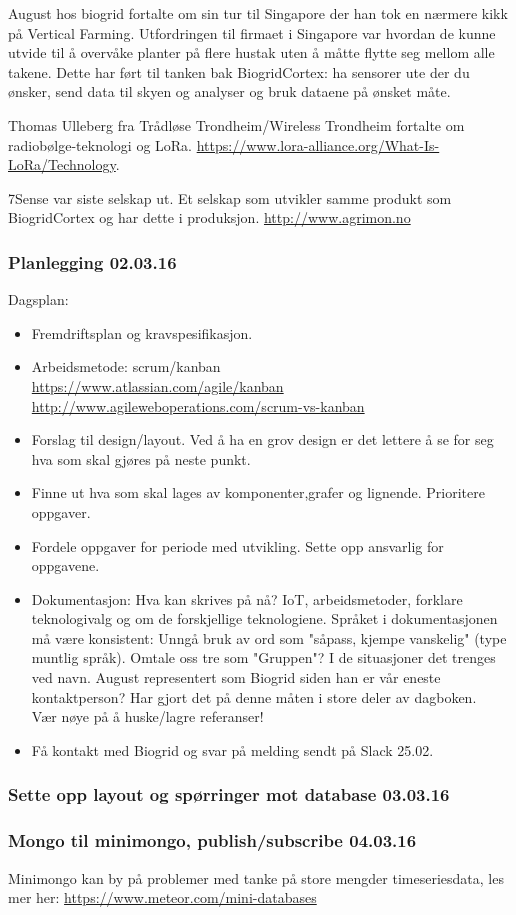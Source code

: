 \documentclass[12pt, oneside]{article}
\begin{document}
August hos biogrid fortalte om sin tur til Singapore der han tok en nærmere kikk på Vertical Farming. Utfordringen til firmaet i Singapore var hvordan de kunne utvide til å overvåke planter på flere hustak uten å måtte flytte seg mellom alle takene. Dette har ført til tanken bak BiogridCortex: ha sensorer ute der du ønsker, send data til skyen og analyser og bruk dataene på ønsket måte.

Thomas Ulleberg fra Trådløse Trondheim/Wireless Trondheim fortalte om radiobølge-teknologi og LoRa. \url{https://www.lora-alliance.org/What-Is-LoRa/Technology}. 

7Sense var siste selskap ut. Et selskap som utvikler samme produkt som BiogridCortex og har dette i produksjon. \url{http://www.agrimon.no}



\subsubsection{Planlegging 02.03.16} 
Dagsplan:
\begin{itemize}
\item Fremdriftsplan og kravspesifikasjon. 
\item Arbeidsmetode: scrum/kanban\\
\url{https://www.atlassian.com/agile/kanban}\\
\url{http://www.agileweboperations.com/scrum-vs-kanban}
\item Forslag til design/layout. Ved å ha en grov design er det lettere å se for seg hva som skal gjøres på neste punkt. 
\item Finne ut hva som skal lages av komponenter,grafer og lignende. Prioritere oppgaver.
\item Fordele oppgaver for periode med utvikling. Sette opp ansvarlig for oppgavene.
\item Dokumentasjon: Hva kan skrives på nå? IoT, arbeidsmetoder, forklare teknologivalg og om de forskjellige teknologiene. Språket i dokumentasjonen må være konsistent: Unngå bruk av ord som "såpass, kjempe vanskelig" (type muntlig språk). Omtale oss tre som "Gruppen"? I de situasjoner det trenges ved navn. August representert som Biogrid siden han er vår eneste kontaktperson? Har gjort det på denne måten i store deler av dagboken. \\ 
Vær nøye på å huske/lagre referanser!
\item Få kontakt med Biogrid og svar på melding sendt på Slack 25.02.
\end{itemize}



\subsubsection{Sette opp layout og spørringer mot database 03.03.16}



\subsubsection{Mongo til minimongo, publish/subscribe 04.03.16}
Minimongo kan by på problemer med tanke på store mengder timeseriesdata, les mer her: \url{https://www.meteor.com/mini-databases}


\end{document}

